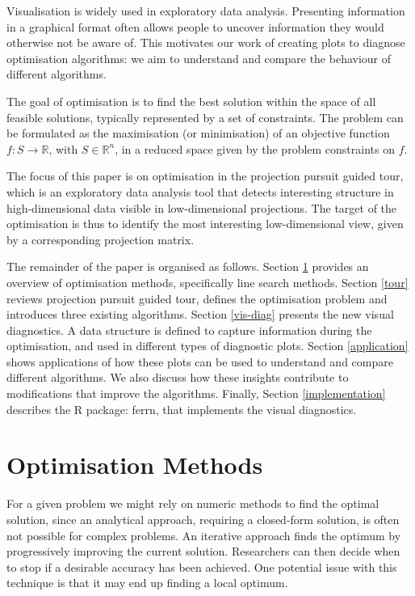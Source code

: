 \documentclass[12pt]{article}
\begin{document}
Visualisation is widely used in exploratory data analysis. Presenting information in a graphical format often allows people to uncover information they would otherwise not be aware of. This motivates our work of creating plots to diagnose optimisation algorithms: we aim to understand and compare the behaviour of different algorithms.

The goal of optimisation is to find the best solution within the space of all feasible solutions, typically represented by a set of constraints. The problem can be formulated as the maximisation (or minimisation) of an objective function \(f: S \rightarrow \mathbb{R}\), with \(S \in \mathbb{R}^n\), in a reduced space given by the problem constraints on \(f\).

The focus of this paper is on optimisation in the projection pursuit guided tour, which is an exploratory data analysis tool that detects interesting structure in high-dimensional data visible in low-dimensional projections. The target of the optimisation is thus to identify the most interesting low-dimensional view, given by a corresponding projection matrix.

The remainder of the paper is organised as follows.
Section \ref{optim} provides an overview of optimisation methods, specifically line search methods.
Section \ref{tour} reviews projection pursuit guided tour, defines the optimisation problem and introduces three existing algorithms.
Section \ref{vis-diag} presents the new visual diagnostics. A data structure is defined to capture information during the optimisation, and used in different types of diagnostic plots.
Section \ref{application} shows applications of how these plots can be used to understand and compare different algorithms. We also discuss how these insights contribute to modifications that improve the algorithms.
Finally, Section \ref{implementation} describes the R package: ferrn, that implements the visual diagnostics.

\hypertarget{optim}{%
\section{Optimisation Methods}\label{optim}}

For a given problem we might rely on numeric methods to find the optimal solution, since an analytical approach, requiring a closed-form solution, is often not possible for complex problems.
An iterative approach finds the optimum by progressively improving the current solution. Researchers can then decide when to stop if a desirable accuracy has been achieved. One potential issue with this technique is that it may end up finding a local optimum.
\end{document}
